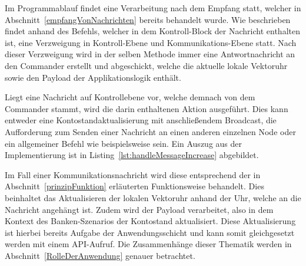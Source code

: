 Im Programmablauf findet eine Verarbeitung nach dem Empfang statt, welcher in Abschnitt~\ref{empfangVonNachrichten} bereits behandelt wurde. Wie beschrieben findet anhand des Befehls, welcher in dem Kontroll-Block der Nachricht enthalten ist, eine Verzweigung in Kontroll-Ebene und Kommunikations-Ebene statt. Nach dieser Verzweigung wird in der selben Methode immer eine Antwortnachricht an den Commander erstellt und abgeschickt, welche die aktuelle lokale Vektoruhr sowie den Payload der Applikationslogik enthält.

Liegt eine Nachricht auf Kontrollebene vor, welche demnach von dem Commander stammt, wird die darin enthaltenen Aktion ausgeführt. Dies kann entweder eine Kontostandaktualisierung mit anschließendem Broadcast, die Aufforderung zum Senden einer Nachricht an einen anderen einzelnen Node oder ein allgemeiner Befehl wie beispielsweise  sein. Ein Auszug aus der Implementierung ist in Listing~\ref{lst:handleMessageIncrease} abgebildet.

Im Fall einer Kommunikationsnachricht wird diese entsprechend der in Abschnitt~\ref{prinzipFunktion} erläuterten Funktionsweise behandelt. Dies beinhaltet das Aktualisieren der lokalen Vektoruhr anhand der Uhr, welche an die Nachricht angehängt ist. Zudem wird der Payload verarbeitet, also in dem Kontext des Banken-Szenarios der Kontostand aktualisiert. Diese Aktualisierung ist hierbei bereits Aufgabe der Anwendungsschicht und kann somit gleichgesetzt werden mit einem API-Aufruf. Die Zusammenhänge dieser Thematik werden in Abschnitt~\ref{RolleDerAnwendung} genauer betrachtet.


